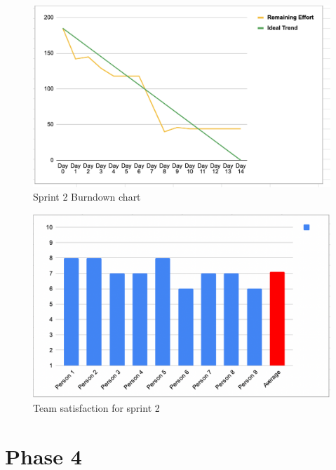 \documentclass{article}
\begin{document}
\begin{figure}[h!]
    \centering
    \includegraphics[scale=0.6]{pfrFigures/Sprint2.png}
    \caption{Sprint 2 Burndown chart}
    \label{fig:Burndown1}
\end{figure}

\begin{figure}[h!]
    \centering
    \includegraphics[scale=0.6]{pfrFigures/TeamSatisfaction2.png}
    \caption{Team satisfaction for sprint 2}
    \label{fig:Satisfaction2}
\end{figure}

\section{Phase 4} %
\end{document}
